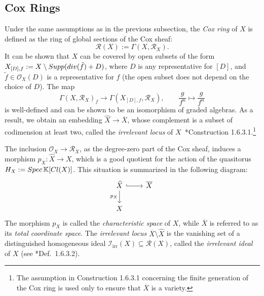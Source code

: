 \documentclass{amsart}
\theoremstyle{definition}
\theoremstyle{remark}
\begin{document}
\subsection{Cox Rings}
Under the same assumptions as in the previous subsection, the {\em Cox ring} of $X$ is defined as the ring of global sections of the Cox sheaf:
\[
 \mathcal{R}(X) := \Gamma(X, \mathcal{R}_X).
\]
It can be shown that $X$ can be covered by open subsets of the form
$X_{[D], f} := X \setminus {\rm Supp}({\rm div}(\tilde{f}) + D)$,
where $D$ is any representative for $[D]$, and $\tilde{f} \in \mathcal{O}_X(D)$ is a representative for $f$
(the open subset does not depend on the choice of $D$). The map
\[
 \Gamma(X, \mathcal{R}_X)_f \to \Gamma(X_{[D], f}, \mathcal{R}_X),
 \qquad \frac{g}{f^n} \mapsto \frac{g}{f^n}
\]
is well-defined and can be shown to be an isomorphism of graded algebras.
As a result, we obtain an embedding $\widehat{X} \to \overline{X}$, whose complement is a subset of codimension at least two, called the
{\em irrelevant locus} of $X$~\cite{adhl}*{Construction 1.6.3.1}.\footnote{The assumption in Construction 1.6.3.1 concerning the finite generation of the Cox ring is used only to ensure that $\overline{X}$ is a variety.}

The inclusion $\mathcal{O}_X \to \mathcal{R}_X$, as the degree-zero part of the Cox sheaf, induces a morphism $p_X\colon \widehat{X} \to X$, which is a good quotient for the action of the quasitorus $H_X := {\rm Spec}\, \mathbb{K}[{\rm Cl}(X)]$.
This situation is summarized in the following diagram:
\[
\begin{tikzcd}
\widehat{X} \arrow[r, hookrightarrow] \arrow[d, "p_X"'] & \overline{X} \\
X
\end{tikzcd}
\]
The morphism $p_X$ is called the {\em characteristic space} of $X$, while $\overline{X}$ is referred to as its {\em total coordinate space}. The \emph{irrelevant locus}
$\overline X \setminus \widehat X$
is the vanishing set of a distinguished homogeneous ideal
\(\mathscr I_{\mathrm{irr}}(X) \subseteq \mathcal R(X)\),
called the \emph{irrelevant ideal} of $X$ (see \cite{adhl}*{Def.~1.6.3.2}).
\end{document}

